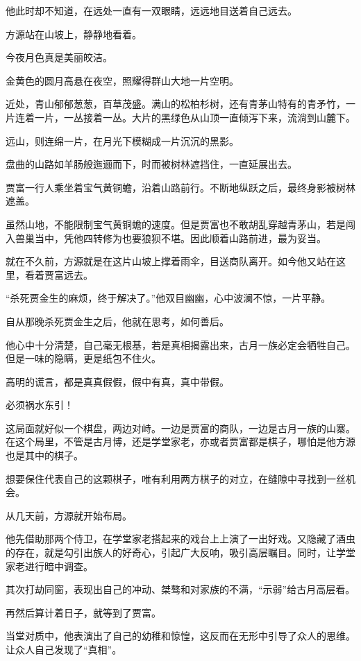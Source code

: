 \begin{this_body}
他此时却不知道，在远处一直有一双眼睛，远远地目送着自己远去。

方源站在山坡上，静静地看着。

今夜月色真是美丽皎洁。

金黄色的圆月高悬在夜空，照耀得群山大地一片空明。

近处，青山郁郁葱葱，百草茂盛。满山的松柏杉树，还有青茅山特有的青矛竹，一片连着一片，一丛接着一丛。大片的黑绿色从山顶一直倾泻下来，流淌到山麓下。

远山，则连绵一片，在月光下模糊成一片沉沉的黑影。

盘曲的山路如羊肠般迤逦而下，时而被树林遮挡住，一直延展出去。

贾富一行人乘坐着宝气黄铜蟾，沿着山路前行。不断地纵跃之后，最终身影被树林遮盖。

虽然山地，不能限制宝气黄铜蟾的速度。但是贾富也不敢胡乱穿越青茅山，若是闯入兽巢当中，凭他四转修为也要狼狈不堪。因此顺着山路前进，最为妥当。

就在不久前，方源就是在这片山坡上撑着雨伞，目送商队离开。如今他又站在这里，看着贾富远去。

“杀死贾金生的麻烦，终于解决了。”他双目幽幽，心中波澜不惊，一片平静。

自从那晚杀死贾金生之后，他就在思考，如何善后。

他心中十分清楚，自己毫无根基，若是真相揭露出来，古月一族必定会牺牲自己。但是一味的隐瞒，更是纸包不住火。

高明的谎言，都是真真假假，假中有真，真中带假。

必须祸水东引！

这局面就好似一个棋盘，两边对峙。一边是贾富的商队，一边是古月一族的山寨。在这个局里，不管是古月博，还是学堂家老，亦或者贾富都是棋子，哪怕是他方源也是其中的棋子。

想要保住代表自己的这颗棋子，唯有利用两方棋子的对立，在缝隙中寻找到一丝机会。

从几天前，方源就开始布局。

他先借助那两个侍卫，在学堂家老搭起来的戏台上上演了一出好戏。又隐藏了酒虫的存在，就是勾引出族人的好奇心，引起广大反响，吸引高层瞩目。同时，让学堂家老进行暗中调查。

其次打劫同窗，表现出自己的冲动、桀骜和对家族的不满，“示弱”给古月高层看。

再然后算计着日子，就等到了贾富。

当堂对质中，他表演出了自己的幼稚和惊惶，这反而在无形中引导了众人的思维。让众人自己发现了“真相”。


\end{this_body}
